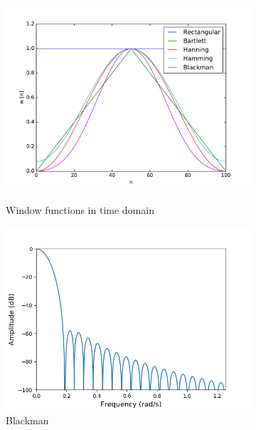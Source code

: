 \begin{figure}[H]
\centering
\begin{subfigure}{0.49\textwidth}
\centering
\includegraphics[width=\textwidth]{figures/filter_teori/window_types.pdf}
\caption{Window functions in time domain}
\label{fig:win_type}
\includegraphics[width=\textwidth]{figures/dbplots/blackman.png}
\caption{Blackman}
\label{fig:blackman_db}
\end{subfigure}
\begin{subfigure}{0.49\textwidth}
\centering

\end{subfigure}
\end{figure}

